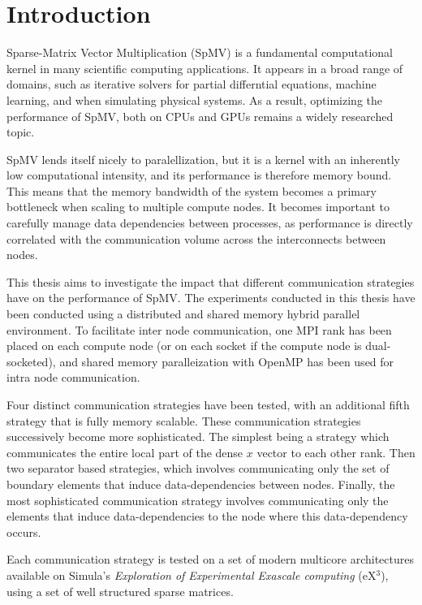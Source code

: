 



\chapter{Introduction}


Sparse-Matrix Vector Multiplication (SpMV) is a fundamental computational kernel in many scientific computing applications. It appears in a broad range of domains, such as iterative solvers for partial differntial equations, machine learning, and when simulating physical systems. As a result, optimizing the performance of SpMV, both on CPUs and GPUs remains a widely researched topic.
\medskip

SpMV lends itself nicely to paralellization, but it is a kernel with an inherently low computational intensity, and its performance is therefore memory bound. This means that the memory bandwidth of the system becomes a primary bottleneck when scaling to multiple compute nodes. It becomes important to carefully manage data dependencies between processes, as performance is directly correlated with the communication volume across the interconnects between nodes.
\medskip

This thesis aims to investigate the impact that different communication strategies have on the performance of SpMV. The experiments conducted in this thesis have been conducted using a distributed and shared memory hybrid parallel environment. To facilitate inter node communication, one MPI rank has been placed on each compute node (or on each socket if the compute node is dual-socketed), and shared memory paralleization with OpenMP has been used for intra node communication.
\medskip

Four distinct communication strategies have been tested, with an additional fifth strategy that is fully memory scalable. These communication strategies successively become more sophisticated. The simplest being a strategy which communicates the entire local part of the dense \(x\) vector to each other rank. Then two separator based strategies, which involves communicating only the set of boundary elements that induce data-dependencies between nodes. Finally, the most sophisticated communication strategy involves communicating only the elements that induce data-dependencies to the node where this data-dependency occurs. 
\medskip

Each communication strategy is tested on a set of modern multicore architectures available on Simula's \textit{Exploration of Experimental Exascale computing} (eX\(^{3}\)), using a set of well structured sparse matrices.


